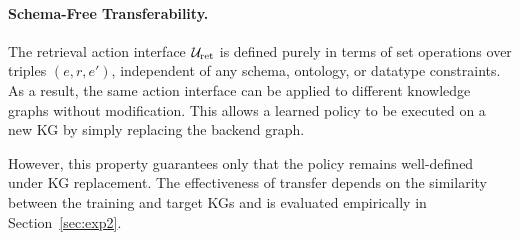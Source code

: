 \paragraph{Schema-Free Transferability.}
The retrieval action interface $\mathcal{U}_{\text{ret}}$ is defined purely in terms of set operations over triples $(e,r,e')$, independent of any schema, ontology, or datatype constraints. As a result, the same action interface can be applied to different knowledge graphs without modification. This allows a learned policy to be executed on a new KG by simply replacing the backend graph.

However, this property guarantees only that the policy remains well-defined under KG replacement. The effectiveness of transfer depends on the similarity between the training and target KGs and is evaluated empirically in Section~\ref{sec:exp2}.
